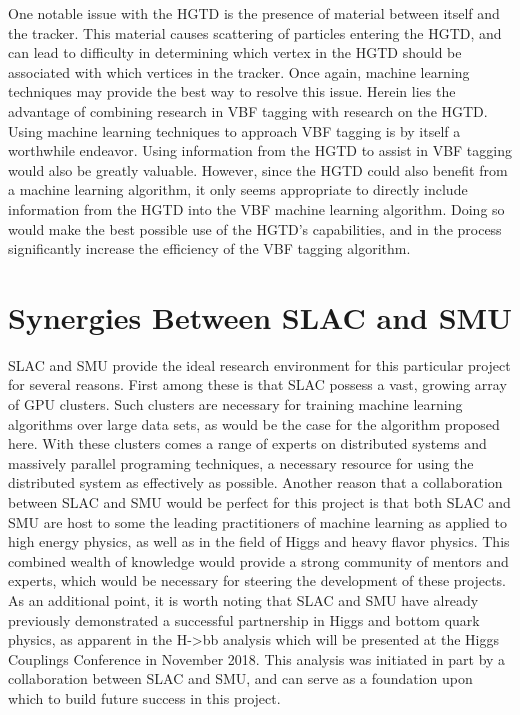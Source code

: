 \documentclass[12pt,letterpaper]{article}
\begin{document}
    One notable issue with the HGTD is the presence of material between itself and the tracker. This material causes scattering of particles entering the HGTD, and can lead to difficulty in determining which vertex in the HGTD should be associated with which vertices in the tracker. Once again, machine learning techniques may provide the best way to resolve this issue. Herein lies the advantage of combining research in VBF tagging with research on the HGTD. Using machine learning techniques to approach VBF tagging is by itself a worthwhile endeavor. Using information from the HGTD to assist in VBF tagging would also be greatly valuable. However, since the HGTD could also benefit from a machine learning algorithm, it only seems appropriate to directly include information from the HGTD into the VBF machine learning algorithm. Doing so would make the best possible use of the HGTD's capabilities, and in the process significantly increase the efficiency of the VBF tagging algorithm.



\section*{Synergies Between SLAC and SMU}
    SLAC and SMU provide the ideal research environment for this particular project for several reasons. First among these is that SLAC possess a vast, growing array of GPU clusters. Such clusters are necessary for training machine learning algorithms over large data sets, as would be the case for the algorithm proposed here. With these clusters comes a range of experts on distributed systems and massively parallel programing techniques, a necessary resource for using the distributed system as effectively as possible. Another reason that a collaboration between SLAC and SMU would be perfect for this project is that both SLAC and SMU are host to some the leading practitioners of machine learning as applied to high energy physics, as well as in the field of Higgs and heavy flavor physics. This combined wealth of knowledge would provide a strong community of mentors and experts, which would be necessary for steering the development of these projects. As an additional point, it is worth noting that SLAC and SMU have already previously demonstrated a successful partnership in Higgs and bottom quark physics, as apparent in the H->bb analysis which will be presented at the Higgs Couplings Conference in November 2018. This analysis was initiated in part by a collaboration between SLAC and SMU, and can serve as a foundation upon which to build future success in this project.
    
\end{document}
